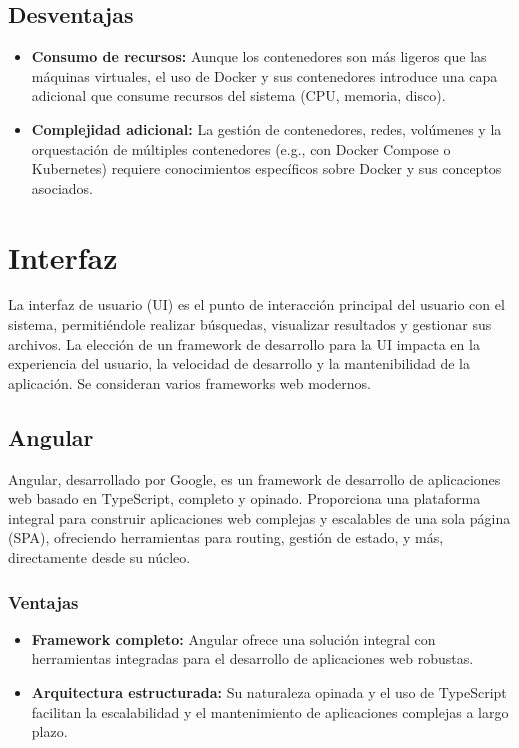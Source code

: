 \subsection{Desventajas}
\begin{itemize}
\item \textbf{Consumo de recursos:} Aunque los contenedores son más ligeros que las máquinas virtuales, el uso de Docker y sus contenedores introduce una capa adicional que consume recursos del sistema (CPU, memoria, disco).
\item \textbf{Complejidad adicional:} La gestión de contenedores, redes, volúmenes y la orquestación de múltiples contenedores (e.g., con Docker Compose o Kubernetes) requiere conocimientos específicos sobre Docker y sus conceptos asociados.
\end{itemize}

\clearpage
\section{Interfaz}
La interfaz de usuario (UI) es el punto de interacción principal del usuario con el sistema, permitiéndole realizar búsquedas, visualizar resultados y gestionar sus archivos. La elección de un framework de desarrollo para la UI impacta en la experiencia del usuario, la velocidad de desarrollo y la mantenibilidad de la aplicación. Se consideran varios frameworks web modernos.

\subsection{Angular}
Angular, desarrollado por Google, es un framework de desarrollo de aplicaciones web basado en TypeScript, completo y opinado. Proporciona una plataforma integral para construir aplicaciones web complejas y escalables de una sola página (SPA), ofreciendo herramientas para routing, gestión de estado, y más, directamente desde su núcleo.

\subsubsection{Ventajas}
\begin{itemize}
\item \textbf{Framework completo:} Angular ofrece una solución integral con herramientas integradas para el desarrollo de aplicaciones web robustas.
\item \textbf{Arquitectura estructurada:} Su naturaleza opinada y el uso de TypeScript facilitan la escalabilidad y el mantenimiento de aplicaciones complejas a largo plazo.
\end{itemize}

